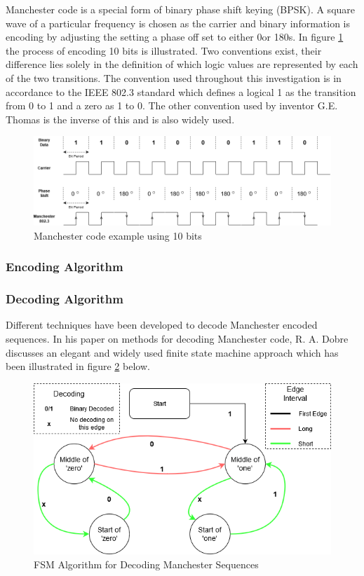 Manchester code is a special form of binary phase shift keying (BPSK). A square wave of a particular frequency is chosen as the carrier and binary information is encoding by adjusting the setting a phase off set to either 0\degree or 180\degree s. In figure \ref{fig:manchesterencoding} the process of encoding 10 bits is illustrated. Two conventions exist, their difference lies solely in the definition of which logic values are represented by each of the two transitions. The convention used throughout this investigation is in accordance to the IEEE 802.3 standard which defines a logical 1 as the transition from 0 to 1 and a zero as 1 to 0. The other convention used by inventor G.E. Thomas is the inverse of this and is also widely used.\\

\begin{figure}[H]
	\centering
	\includegraphics[width=0.7\linewidth]{figures/litreview/manchester_encoding}
	\caption{Manchester code example using 10 bits}
	\label{fig:manchesterencoding}
\end{figure}

\subsubsection{Encoding Algorithm}


\subsubsection{Decoding Algorithm}
Different techniques have been developed to decode Manchester encoded sequences. In his paper on methods for decoding Manchester code, R. A. Dobre discusses an elegant and widely used finite state machine approach which has been illustrated in figure \ref{fig:manchesterdecodingfsm} below. \cite{Dobre2014}

\begin{figure}[H]
	\centering
	\includegraphics[width=0.7\linewidth]{figures/litreview/manchester_decoding_fsm.png}
	\caption{FSM Algorithm for Decoding Manchester Sequences}
	\label{fig:manchesterdecodingfsm}
\end{figure}

